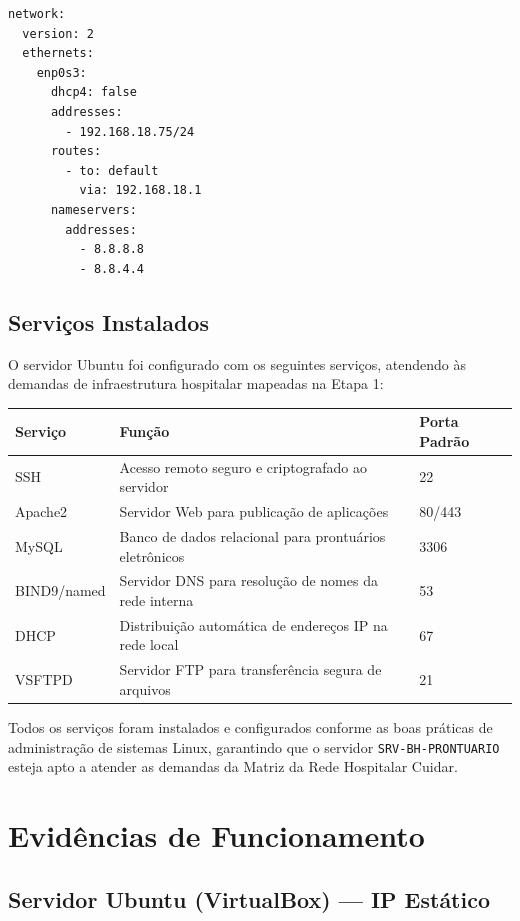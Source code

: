 \documentclass[12pt,a4paper,oneside]{report}
\begin{document}
\begin{center}
\small
\begin{verbatim}
network:
  version: 2
  ethernets:
    enp0s3:
      dhcp4: false
      addresses:
        - 192.168.18.75/24
      routes:
        - to: default
          via: 192.168.18.1
      nameservers:
        addresses:
          - 8.8.8.8
          - 8.8.4.4
\end{verbatim}
\end{center}

\subsection{Serviços Instalados}
O servidor Ubuntu foi configurado com os seguintes serviços, atendendo às demandas de infraestrutura hospitalar mapeadas na Etapa 1:

\begin{center}
\small
\begin{tabular}{lll}
\toprule
\textbf{Serviço} & \textbf{Função} & \textbf{Porta Padrão} \\ \midrule
SSH              & Acesso remoto seguro e criptografado ao servidor           & 22  \\
Apache2          & Servidor Web para publicação de aplicações                 & 80/443 \\
MySQL            & Banco de dados relacional para prontuários eletrônicos     & 3306 \\
BIND9/named      & Servidor DNS para resolução de nomes da rede interna      & 53  \\
DHCP             & Distribuição automática de endereços IP na rede local     & 67  \\
VSFTPD           & Servidor FTP para transferência segura de arquivos        & 21  \\
\bottomrule
\end{tabular}
\end{center}

Todos os serviços foram instalados e configurados conforme as boas práticas de administração de sistemas Linux, garantindo que o servidor \texttt{SRV-BH-PRONTUARIO} esteja apto a atender as demandas da Matriz da Rede Hospitalar Cuidar.

\section{Evidências de Funcionamento}

\subsection{Servidor Ubuntu (VirtualBox) --- IP Estático}
\end{document}
